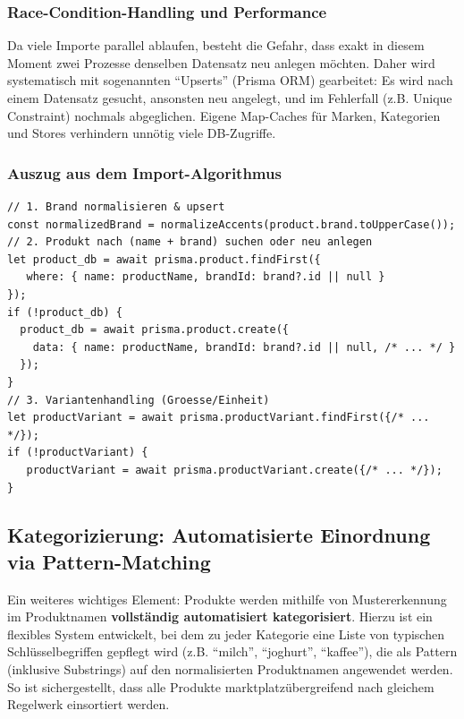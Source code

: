 \documentclass[12pt, a4paper]{report} %
\begin{document}
\subsubsection{Race-Condition-Handling und Performance}
Da viele Importe parallel ablaufen, besteht die Gefahr, dass exakt in diesem Moment zwei Prozesse denselben Datensatz neu anlegen möchten. Daher wird systematisch mit sogenannten "`Upserts"' (Prisma ORM) gearbeitet: Es wird nach einem Datensatz gesucht, ansonsten neu angelegt, und im Fehlerfall (z.B. Unique Constraint) nochmals abgeglichen. Eigene Map-Caches für Marken, Kategorien und Stores verhindern unnötig viele DB-Zugriffe.

\subsubsection{Auszug aus dem Import-Algorithmus}
\begin{lstlisting}[style=typescriptstyle, caption={Produkt-Import: Algorithmus bei Name-Matching und DB-Schreibvorgang}]
// 1. Brand normalisieren & upsert
const normalizedBrand = normalizeAccents(product.brand.toUpperCase());
// 2. Produkt nach (name + brand) suchen oder neu anlegen
let product_db = await prisma.product.findFirst({
   where: { name: productName, brandId: brand?.id || null }
});
if (!product_db) {
  product_db = await prisma.product.create({
    data: { name: productName, brandId: brand?.id || null, /* ... */ }
  });
}
// 3. Variantenhandling (Groesse/Einheit)
let productVariant = await prisma.productVariant.findFirst({/* ... */});
if (!productVariant) {
   productVariant = await prisma.productVariant.create({/* ... */});
}
\end{lstlisting}

\subsection{Kategorizierung: Automatisierte Einordnung via Pattern-Matching}

Ein weiteres wichtiges Element: Produkte werden mithilfe von Mustererkennung im Produktnamen \textbf{vollständig automatisiert kategorisiert}. Hierzu ist ein flexibles System entwickelt, bei dem zu jeder Kategorie eine Liste von typischen Schlüsselbegriffen gepflegt wird (z.B. "`milch"', "`joghurt"', "`kaffee"'), die als Pattern (inklusive Substrings) auf den normalisierten Produktnamen angewendet werden. So ist sichergestellt, dass alle Produkte marktplatzübergreifend nach gleichem Regelwerk einsortiert werden.
\end{document}

